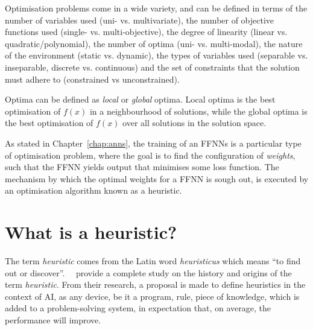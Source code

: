 Optimisation problems come in a wide variety, and can be defined in terms of the number of variables used (uni- vs. multivariate), the number of objective functions used (single- vs. multi-objective), the degree of linearity (linear vs. quadratic/polynomial), the number of optima (uni- vs. multi-modal), the nature of the environment (static vs. dynamic), the types of variables used (separable vs. inseparable, discrete vs. continuous) and the set of constraints that the solution must adhere to (constrained vs unconstrained).

Optima can be defined as \textit{local} or \textit{global} optima. Local optima is the best optimisation of $f(x)$ in a neighbourhood of solutions, while the global optima is the best optimisation of $f(x)$ over all solutions in the solution space.

As stated in Chapter~\ref{chap:anns}, the training of an \acp{FFNN} is a particular type of optimisation problem, where the goal is to find the configuration of \textit{weights}, such that the \acs{FFNN} yields output that minimises some loss function. The mechanism by which the optimal weights for a \acs{FFNN} is sough out, is executed by an optimisation algorithm known as a heuristic.

\section{What is a heuristic?}\label{sec:heuristics:what_is_a_heuristic}

The term \textit{heuristic} comes from the Latin word \textit{heuristicus} which means ``to find out or discover''.~\citeauthor{ref:romanycia:1985}~\cite{ref:romanycia:1985} provide a complete study on the history and origins of the term \textit{heuristic}. From their research, a proposal is made to define heuristics in the context of \acf{AI}, as any device, be it a program, rule, piece of knowledge, which is added to a problem-solving system, in expectation that, on average, the performance will improve.

